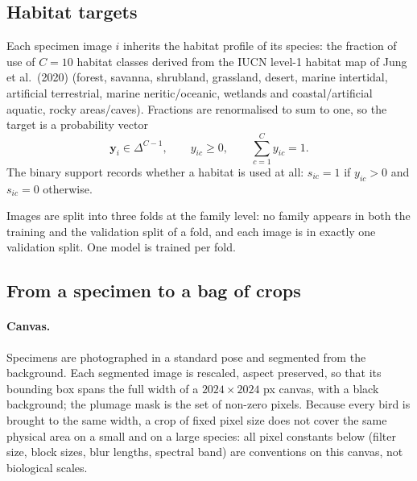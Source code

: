 
\subsection{Habitat targets}

Each specimen image $i$ inherits the habitat profile of its species: the
fraction of use of $C = 10$ habitat classes derived from the IUCN level-1
habitat map of Jung et al.\ (2020) (forest, savanna, shrubland, grassland,
desert, marine intertidal, artificial terrestrial, marine neritic/oceanic,
wetlands and coastal/artificial aquatic, rocky areas/caves).
Fractions are renormalised to sum to one, so the target is a probability
vector
\begin{equation}
  \mathbf{y}_i \in \Delta^{C-1}, \qquad y_{ic} \ge 0, \qquad \sum_{c=1}^{C} y_{ic} = 1.
\end{equation}
The binary support records whether a habitat is used at all: $s_{ic} = 1$ if
$y_{ic} > 0$ and $s_{ic} = 0$ otherwise.

Images are split into three folds at the family level: no family appears in
both the training and the validation split of a fold, and each image is in
exactly one validation split. One model is trained per fold.

\subsection{From a specimen to a bag of crops}

\paragraph{Canvas.}
Specimens are photographed in a standard pose and segmented from the
background. Each segmented image is rescaled, aspect preserved, so that its
bounding box spans the full width of a $2024 \times 2024$ px canvas, with a
black background; the plumage mask is the set of non-zero pixels. Because
every bird is brought to the same width, a crop of fixed pixel size does not
cover the same physical area on a small and on a large species: all pixel
constants below (filter size, block sizes, blur lengths, spectral band) are
conventions on this canvas, not biological scales.

